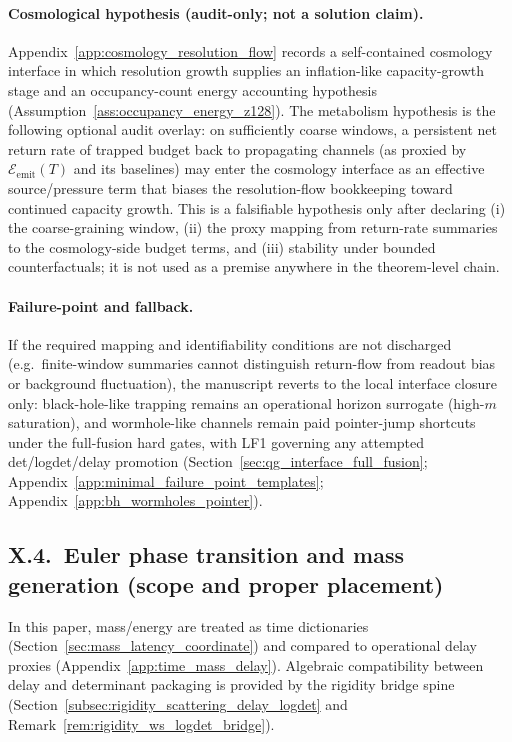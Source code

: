 \paragraph{Cosmological hypothesis (audit-only; not a solution claim).}
\AuditTag Appendix~\ref{app:cosmology_resolution_flow} records a self-contained cosmology interface in which resolution growth supplies an inflation-like capacity-growth stage and an occupancy-count energy accounting hypothesis
(Assumption~\ref{ass:occupancy_energy_z128}).
The metabolism hypothesis is the following optional audit overlay:
on sufficiently coarse windows, a persistent net return rate of trapped budget back to propagating channels (as proxied by $\mathcal{E}_{\mathrm{emit}}(T)$ and its baselines)
may enter the cosmology interface as an effective source/pressure term that biases the resolution-flow bookkeeping toward continued capacity growth.
This is a falsifiable hypothesis only after declaring (i) the coarse-graining window, (ii) the proxy mapping from return-rate summaries to the cosmology-side budget terms,
and (iii) stability under bounded counterfactuals; it is not used as a premise anywhere in the theorem-level chain.

\paragraph{Failure-point and fallback.}
\AuditTag If the required mapping and identifiability conditions are not discharged (e.g.\ finite-window summaries cannot distinguish return-flow from readout bias or background fluctuation),
the manuscript reverts to the local interface closure only:
black-hole-like trapping remains an operational horizon surrogate (high-$m$ saturation), and wormhole-like channels remain paid pointer-jump shortcuts under the full-fusion hard gates,
with LF1 governing any attempted det/logdet/delay promotion (Section~\ref{sec:qg_interface_full_fusion}; Appendix~\ref{app:minimal_failure_point_templates}; Appendix~\ref{app:bh_wormholes_pointer}).

\subsection{X.4.\ Euler phase transition and mass generation (scope and proper placement)}
\label{subsec:x4_euler_phase_transition_scope}

\InterfaceTag In this paper, mass/energy are treated as time dictionaries (Section~\ref{sec:mass_latency_coordinate}) and compared to operational delay proxies (Appendix~\ref{app:time_mass_delay}).
Algebraic compatibility between delay and determinant packaging is provided by the rigidity bridge spine (Section~\ref{subsec:rigidity_scattering_delay_logdet} and Remark~\ref{rem:rigidity_ws_logdet_bridge}).

